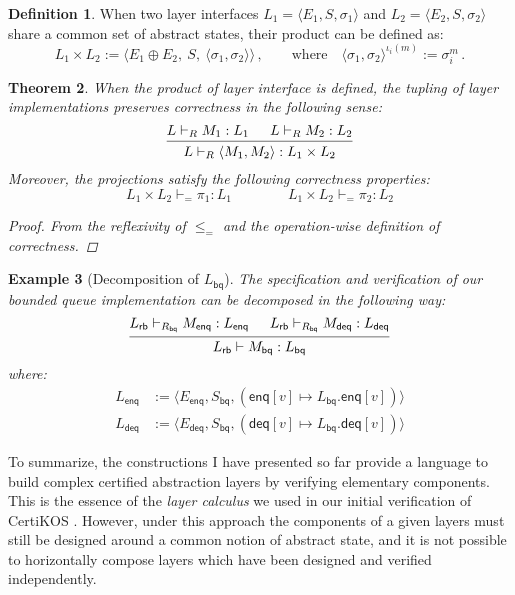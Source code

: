 \documentclass[11pt,oneside,draft]{book}
\newtheorem{theorem}{Theorem}[chapter]
\newtheorem{example}[theorem]{Example}
\theoremstyle{definition}
\newtheorem{definition}[theorem]{Definition}
\newcommand{\kw}[1]{\ensuremath{ \mathsf{#1} }}
\begin{document}
\begin{definition}
When two layer interfaces
$L_1 = \langle E_1, S, \sigma_1 \rangle$ and
$L_2 = \langle E_2, S, \sigma_2 \rangle$
share a common set of abstract states,
their product can be defined as:
\[
  L_1 \times L_2 :=
    \langle
      E_1 \oplus E_2, \:
      S, \:
      \langle \sigma_1, \sigma_2 \rangle
    \rangle \,,
  \qquad
  \text{where}
  \quad
  \langle \sigma_1, \sigma_2 \rangle^{\iota_i(m)} := \sigma_i^m \,.
\]
\end{definition}

\begin{theorem}
When the product of layer interface is defined,
the tupling of layer implementations
preserves correctness in the following sense:
\[
  \begin{prooftree}
    \hypo{L \vdash_R M_1 : L_1}
    \hypo{L \vdash_R M_2 : L_2}
    \infer2{L \vdash_R \langle M_1, M_2 \rangle : L_1 \times L_2}
  \end{prooftree}
\]
Moreover, the projections satisfy the following correctness properties:
\[
   L_1 \times L_2 \vdash_{=} \pi_1 : L_1 \qquad \qquad
   L_1 \times L_2 \vdash_{=} \pi_2 : L_2
\]
\begin{proof}
From the reflexivity of $\le_=$ and
the operation-wise definition of correctness.
\end{proof}
\end{theorem}

\begin{example}[Decomposition of $L_\kw{bq}$]
The specification and verification of
our bounded queue implementation can be decomposed
in the following way:
\[
  \begin{prooftree}
    \hypo{L_\kw{rb} \vdash_{R_\kw{bq}} M_\kw{enq} : L_\kw{enq}}
    \hypo{L_\kw{rb} \vdash_{R_\kw{bq}} M_\kw{deq} : L_\kw{deq}}
    \infer2{L_\kw{rb} \vdash M_\kw{bq} : L_\kw{bq}}
  \end{prooftree}
\]
where:
\begin{align*}
  L_\kw{enq} &:=
    \langle E_\kw{enq}, S_\kw{bq},
      (\kw{enq}[v] \mapsto L_\kw{bq}.\kw{enq}[v]) \rangle \\
  L_\kw{deq} &:=
    \langle E_\kw{deq}, S_\kw{bq},
      (\kw{deq}[v] \mapsto L_\kw{bq}.\kw{deq}[v]) \rangle
\end{align*}
\end{example}

To summarize,
the constructions I have presented so far
provide a language to build
complex certified abstraction layers
by verifying elementary components.
This is the essence of the \emph{layer calculus}
we used in our initial verification of CertiKOS
\citep{popl15}.
However,
under this approach the components of a given layers
must still be designed around a common notion of abstract state,
and it is not possible to horizontally compose
layers which have been designed and verified independently.
\end{document}
